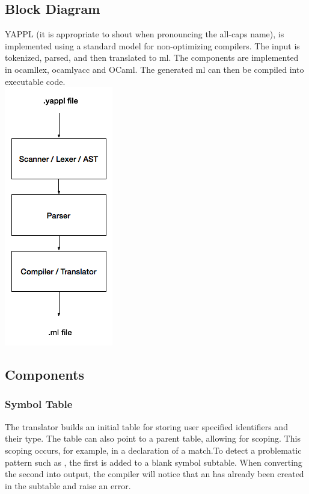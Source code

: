 \subsection{Block Diagram}

YAPPL (it is appropriate to shout when pronouncing the all-caps name), is implemented using a standard model for non-optimizing compilers. The input is tokenized, parsed, and then translated to ml. The components are implemented in ocamllex, ocamlyacc and OCaml. The generated ml can then be compiled into executable code. \\
\includegraphics{block-diagram.png}

\subsection{Components}
\subsubsection{Symbol Table}
The translator builds an initial table for storing user specified identifiers and their type. The table can also point to a parent table, allowing for scoping. This scoping occurs, for example, in a declaration of a \term{(}  \term{::}  \term{)} match.To detect a problematic pattern such as  , the first  is added to a blank symbol subtable. When converting the second  into output, the compiler will notice that an  has already been created in the subtable and raise an error. 
